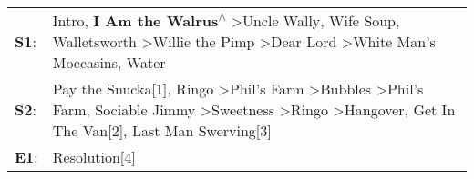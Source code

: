\begin{supertabular}{p{0.03\textwidth}p{0.92\textwidth}}
 \textbf{S1}:  &                                                                                         Intro\textsuperscript{}, \enspace \textbf{I Am the Walrus\textsuperscript{$\wedge$}} \textgreater \enspace Uncle Wally\textsuperscript{}, \enspace Wife Soup\textsuperscript{}, \enspace Walletsworth\textsuperscript{} \textgreater \enspace Willie the Pimp\textsuperscript{} \textgreater \enspace Dear Lord\textsuperscript{} \textgreater \enspace White Man's Moccasins\textsuperscript{}, \enspace Water\textsuperscript{}  \enspace  \\
 \textbf{S2}:  &  Pay the Snucka[1]\textsuperscript{}, \enspace Ringo\textsuperscript{} \textgreater \enspace Phil's Farm\textsuperscript{} \textgreater \enspace Bubbles\textsuperscript{} \textgreater \enspace Phil's Farm\textsuperscript{}, \enspace Sociable Jimmy\textsuperscript{} \textgreater \enspace Sweetness\textsuperscript{} \textgreater \enspace Ringo\textsuperscript{} \textgreater \enspace Hangover\textsuperscript{}, \enspace Get In The Van[2]\textsuperscript{}, \enspace Last Man Swerving[3]\textsuperscript{}  \enspace  \\
 \textbf{E1}:  &                                                                                                                                                                                                                                                                                                                                                                                                                                                                                           Resolution[4]\textsuperscript{}  \enspace  \\
\end{supertabular}
